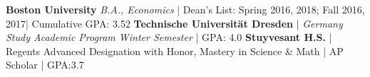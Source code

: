 %
%
%


\begin{scholarship}
					{\textbf{Boston University} 
					\textit{B.A., Economics} | Dean’s List: Spring 2016, 2018; Fall 2016, 2017| Cumulative GPA: 3.52}
					{\textbf{Technische Universität Dresden} | \textit{Germany Study Academic Program Winter Semester} | GPA: 4.0}
					{\textbf{Stuyvesant H.S.} | Regents Advanced Designation with Honor, Mastery in Science \& Math | AP Scholar | GPA:3.7}
\end{scholarship}
\smallskip
\\
